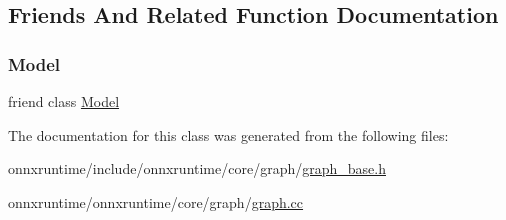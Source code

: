 \subsection{Friends And Related Function Documentation}
\mbox{\label{classonnxruntime_1_1Graph_a2bf2a0e9b454c55aa5dcb5aa4698697b}} 
\subsubsection{\texorpdfstring{Model}{Model}}
{\footnotesize\ttfamily friend class \mbox{\hyperlink{classonnxruntime_1_1Model}{Model}}\hspace{0.3cm}{\ttfamily [friend]}}



The documentation for this class was generated from the following files\+:\begin{DoxyCompactItemize}
\item 
onnxruntime/include/onnxruntime/core/graph/\mbox{\hyperlink{graph__base_8h}{graph\+\_\+base.\+h}}\item 
onnxruntime/onnxruntime/core/graph/\mbox{\hyperlink{graph_8cc}{graph.\+cc}}\end{DoxyCompactItemize}
